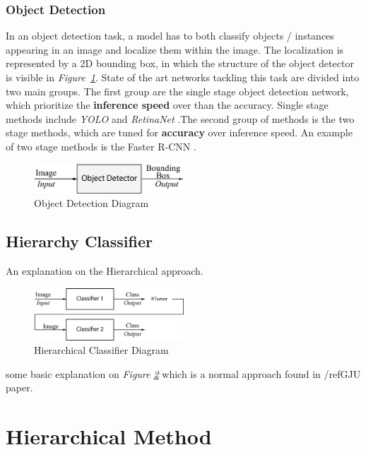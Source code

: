 \documentclass[12pt]{extarticle}
\begin{document}
	\subsubsection{Object Detection}\label{Obj Detection}
	In an object detection task, a model has to both classify objects / instances appearing in an image and localize them within the image. The localization is represented by a 2D bounding box, in which the structure of the object detector is visible in \emph{Figure~\ref{fig:Obj Detector}}. State of the art networks tackling this task are divided into two main groups. The first group are the single stage object detection network, which prioritize the \textbf{inference speed} over than the accuracy. Single stage methods include \emph{YOLO} \cite{Objdet2} and \emph{RetinaNet} \cite{Retina}.The second group of methods is the two stage methods, which are tuned for \textbf{accuracy} over inference speed. An example of two stage methods is the Faster R-CNN \cite{Objdet}.
	\begin{figure}[h]
		\centering
		\includegraphics[width=0.5\textwidth]{pics/Figures/Obj_Det_Block_Diagram.eps}
		\caption{\small{Object Detection Diagram}}
		\label{fig:Obj Detector}
	\end{figure}
	
	\subsection{Hierarchy Classifier}
	An explanation on the Hierarchical approach.
	\begin{figure}[h]
		\centering
		\includegraphics[width=0.5\textwidth]{pics/Figures/Hierarchical_Classifier_Block_Diagram.eps}
		\caption{\small{Hierarchical Classifier Diagram}}
		\label{fig:Hierarchical Classifier}
	\end{figure}
	some basic explanation on \emph{Figure \ref{fig:Hierarchical Classifier}} which is a normal approach found in /ref{GJU paper}.
	\newpage
	
	
	\section{Hierarchical Method}\label{Meth}
	
\end{document}
